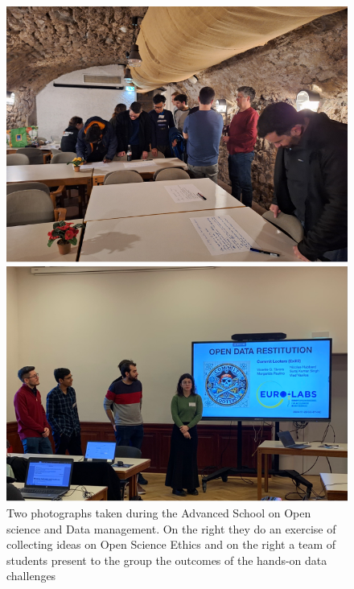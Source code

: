 \begin{figure}[!h]
    \centering
\begin{minipage}{0.48\textwidth}
        \centering
        \includegraphics[width=\textwidth]{graphics/Open science ethics.png}
    \end{minipage}
    \hfill %
    \begin{minipage}{0.51\textwidth}
        \centering
        \includegraphics[width=\textwidth]{graphics/presentation-Open Science.png}
    \end{minipage}   
 \caption{Two photographs taken during the Advanced School on Open science and Data management. On the right they do an exercise of collecting ideas on Open Science Ethics and on the right a team of students present to the group the outcomes of the hands-on data challenges}
    \label{fig:Open_Science_school}
\end{figure}


